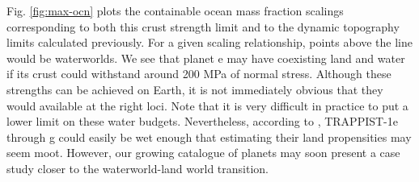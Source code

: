 




Fig. \ref{fig:max-ocn} plots the containable ocean mass fraction scalings corresponding to both this crust strength limit and to the dynamic topography limits calculated previously. For a given scaling relationship, points above the line would be waterworlds. We see that planet e may have coexisting land and water if its crust could withstand around 200 MPa of normal stress. Although these strengths can be achieved on Earth, it is not immediately obvious that they would available at the right loci.
Note that it is very difficult in practice to put a lower limit on these water budgets. Nevertheless, according to \citet{agol_refining_2021}, TRAPPIST-1e through g could easily be wet enough that estimating their land propensities may seem moot. However, our growing catalogue of planets may soon present a case study closer to the waterworld-land world transition. %

